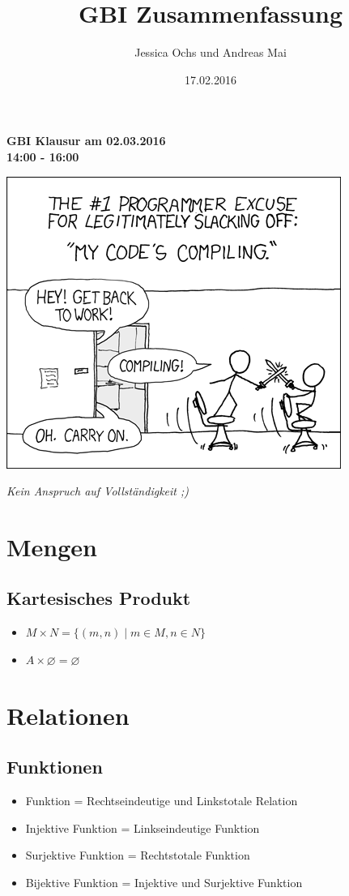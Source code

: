 \documentclass[a4paper,portrait]{scrartcl}
\title{GBI Zusammenfassung}
\author{Jessica Ochs und Andreas Mai}
\date{17.02.2016}
\begin{document}
\maketitle
\begin{center}
\textbf{GBI Klausur am 02.03.2016} \\
\textbf{14:00 - 16:00} 
\end{center}

\includegraphics{compiling}
\begin{center}
\textit{Kein Anspruch auf Vollständigkeit ;)}
\end{center}\clearpage
\tableofcontents
\clearpage
\setcounter{page}{1}

\section{Mengen}
\subsection{Kartesisches Produkt}
\begin{itemize}
\item $ M \times N = \lbrace (m,n)\mid m \in M, n \in N \rbrace $
\item $ A \times \varnothing = \varnothing  $
\end{itemize}
\section{Relationen}
\subsection{Funktionen}
\begin{itemize}
\item Funktion = Rechtseindeutige und Linkstotale Relation
\item Injektive Funktion = Linkseindeutige Funktion
\item Surjektive Funktion = Rechtstotale Funktion
\item Bijektive Funktion = Injektive und Surjektive Funktion 
\end{itemize}
\end{document}
